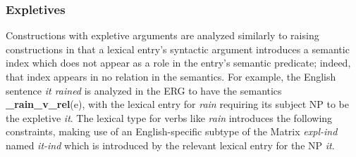 \documentclass[12pt]{article}
\newcommand{\avmplus}[1]{{\setlength{\arraycolsep}{0.8mm}	
                       \renewcommand{\arraystretch}{1.1} %
                       \left[ 			
                       \begin{array}{l}
                       \\[-2mm] #1 \\[-2mm] \\
                       \end{array} 		
                       \right]
                    }}
\newcommand{\att}[1]{{\mbox{\scriptsize {\bf #1}}}}
\newcommand{\attval}[2]{{\mbox{\scriptsize #1}\ {{#2}}}}
\newcommand{\attvallist}[2]{{\mbox{\scriptsize #1}\ {<{#2}>}}}
\newcommand{\ind}[1]{{\setlength{\fboxsep}{0.25mm} \: \fbox{{\small #1}} \:}}
\begin{document}
{
\subsubsection{Expletives}

Constructions with expletive arguments are analyzed similarly to raising
constructions in that a lexical entry's syntactic argument introduces a
semantic index which does not appear as a role in the entry's semantic
predicate; indeed, that index appears in no relation in the semantics.
For example, the English sentence {\it it rained} is analyzed in the ERG
to have the semantics {\bf \_rain\_v\_rel}(e), with the lexical entry for
{\it rain} requiring its subject NP to be the expletive {\it it}.  The
lexical type for verbs like {\it rain} introduces the following constraints,
making use of an English-specific subtype of the Matrix {\it expl-ind} named
{\it it-ind} which is introduced by the relevant lexical entry for the NP
{\it it}.

}
\end{document}
